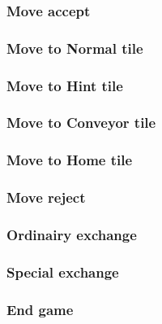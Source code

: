 	\subsubsection{Move accept}
	

	\subsubsection{Move to Normal tile}
	

	\subsubsection{Move to Hint tile}
	

	\subsubsection{Move to Conveyor tile}
	

	\subsubsection{Move to Home tile}
	


	\subsubsection{Move reject}
	


	\subsubsection{Ordinairy exchange}
	
	
	\subsubsection{Special exchange}
	
	
	\subsubsection{End game}
	
